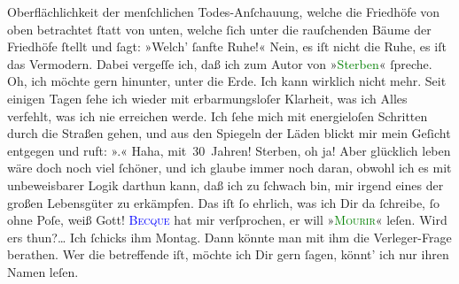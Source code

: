                Oberflächlichkeit der menſchlichen Todes-Anſchauung, welche die Friedhöfe von oben
               betrachtet ſtatt von unten, welche ſich unter die  rauſchenden Bäume der Friedhöfe ſtellt und ſagt: {\pb}»Welch’ ſanfte Ruhe!« Nein, es iſt nicht die Ruhe,
               es iſt das Vermodern.
            \pend
           \pstart
           Dabei vergeſſe ich, daß ich zum Autor von »\textcolor{green}{Sterben}{}\ledrightnote{\textcolor{green}{Sterben. Novelle}}« ſpreche.\pend
           \pstart
            Oh, ich möchte gern  hinunter, unter
               die Erde. Ich kann wirklich nicht mehr. Seit einigen Tagen ſehe ich wieder mit
               erbarmungsloſer Klarheit, was ich Alles verfehlt, was {\pb}ich nie erreichen werde. Ich ſehe mich mit
               energieloſen Schritten durch die Straßen gehen, und aus den Spiegeln der Läden blickt
               mir mein Geſicht entgegen und ruft: »\label{K_L02739-3v}\label{K_L02739-3h}.« Haha, mit 30 Jahren!\pend
           \pstart
           Sterben, oh ja! Aber glücklich leben wäre doch noch viel ſchöner, und {\pb}ich glaube immer noch daran, obwohl ich es mit
               unbeweisbarer Logik darthun kann, daß ich zu ſchwach bin, mir irgend eines der großen
                  Lebensgüter zu erkämpfen.\pend
           \pstart
           Das iſt ſo ehrlich, was ich Dir da ſchreibe, ſo ohne Poſe, weiß Gott!\pend
           \pstart
           \textsc{\textcolor{blue}{Becque}{}\ledrightnote{\textcolor{blue}{Henry Becque}}} hat mir verſprochen, er will »\textsc{\textcolor{green}{Mourir}{}}« leſen. Wird ers thun?{\dots} Ich {\pb}ſchicks ihm Montag.
               Dann könnte man mit ihm die Verleger-Frage berathen.\pend
           \pstart
           Wer die betreffende \label{K_L02739-4v}\label{K_L02739-4h} iſt, möchte ich Dir gern ſagen, könnt’ ich nur ihren Namen leſen.
